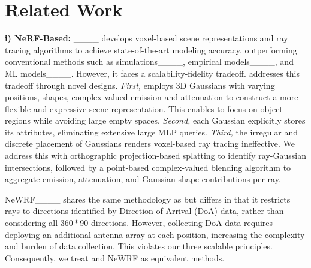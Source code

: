 \section{Related Work}
\label{sec_relatedWork}


\textbf{i) NeRF-Based:}
\nerft____ develops voxel-based scene representations and ray tracing algorithms to achieve state-of-the-art modeling accuracy, outperforming conventional methods such as simulations____, empirical models____, and ML models____.  
However, it faces a scalability-fidelity tradeoff.  
\ourSystem addresses this tradeoff through novel designs.
\textit{First,} \ourSystem employs 3D Gaussians with varying positions, shapes, complex-valued emission and attenuation to construct a more flexible and expressive scene representation.
This enables \ourSystem to focus on object regions while avoiding large empty spaces.
\textit{Second,} each Gaussian explicitly stores its attributes, eliminating extensive large MLP queries.
\textit{Third,} the irregular and discrete placement of Gaussians renders voxel-based ray tracing ineffective. 
We address this with orthographic projection-based splatting to identify ray-Gaussian intersections, followed by a point-based complex-valued blending algorithm to aggregate emission, attenuation, and Gaussian shape contributions per ray.


NeWRF____ shares the same methodology as \nerft but differs in that it restricts rays to directions identified by Direction-of-Arrival (DoA) data, rather than considering all \(360*90\) directions.  
However, collecting DoA data requires deploying an additional antenna array at each position, increasing the complexity and burden of data collection.
This violates our three scalable principles.  
Consequently, we treat \nerft and NeWRF as equivalent methods.